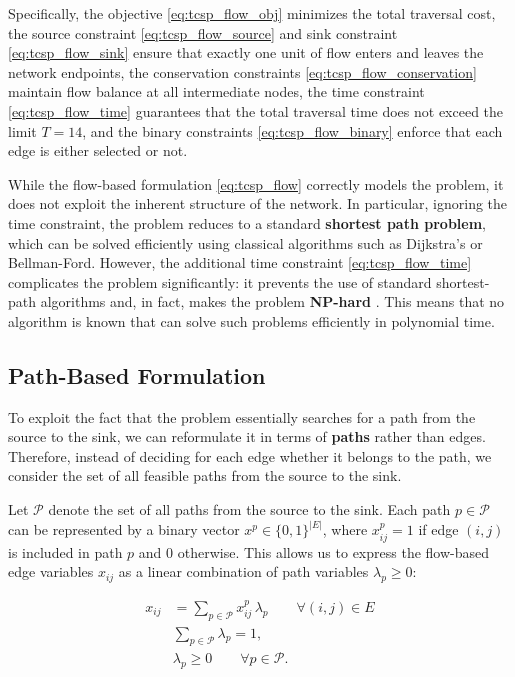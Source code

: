 \documentclass{book}
\theoremstyle{definition}
\newcounter{algorithm_}
\numberwithin{algorithm_}{chapter}
\begin{document}
Specifically, the objective \eqref{eq:tcsp_flow_obj} minimizes the total traversal cost, 
the source constraint \eqref{eq:tcsp_flow_source} and sink constraint \eqref{eq:tcsp_flow_sink} ensure that exactly one unit of flow enters and leaves the network endpoints, the conservation constraints \eqref{eq:tcsp_flow_conservation} maintain flow balance at all intermediate nodes, 
the time constraint \eqref{eq:tcsp_flow_time} guarantees that the total traversal time does not exceed the limit $T=14$, 
and the binary constraints \eqref{eq:tcsp_flow_binary} enforce that each edge is either selected or not.

\bigskip

While the flow-based formulation \eqref{eq:tcsp_flow} correctly models the problem, it does not exploit the inherent structure of the network. 
In particular, ignoring the time constraint, the problem reduces to a standard \textbf{shortest path problem}, which can be solved efficiently using classical algorithms such as Dijkstra's or Bellman-Ford. However, the additional time constraint \eqref{eq:tcsp_flow_time} complicates the problem significantly: it prevents the use of standard shortest-path algorithms and, in fact, makes the problem \textbf{NP-hard} \cite{handler1980}. This means that no algorithm is known that can solve such problems efficiently in polynomial time.

\subsection{Path-Based Formulation}
\label{subsec:pathbased}

To exploit the fact that the problem essentially searches for a path from the source to the sink, we can reformulate it in terms of \textbf{paths} rather than edges. Therefore, instead of deciding for each edge whether it belongs to the path, we consider the set of all feasible paths from the source to the sink.

\bigskip

Let $\mathcal{P}$ denote the set of all paths from the source to the sink.  
Each path $p \in \mathcal{P}$ can be represented by a binary vector $x^p \in \{0,1\}^{|E|}$, where $x^p_{ij} = 1$ if edge $(i,j)$ is included in path $p$ and $0$ otherwise. This allows us to express the flow-based edge variables $x_{ij}$ as a linear combination of path variables $\lambda_p \ge 0$:

\begin{subequations}\label{eq:path_based}
\begin{align}
x_{ij} &= \sum_{p \in \mathcal{P}} x^p_{ij} \, \lambda_p \qquad \forall (i,j) \in E \label{eq:path_based_edge} \\
& \sum_{p \in \mathcal{P}} \lambda_p = 1, \label{eq:path_based_convexity} \\
& \lambda_p \ge 0 \qquad \forall p \in \mathcal{P}. \label{eq:path_based_nonneg}
\end{align}
\end{subequations}
\end{document}
